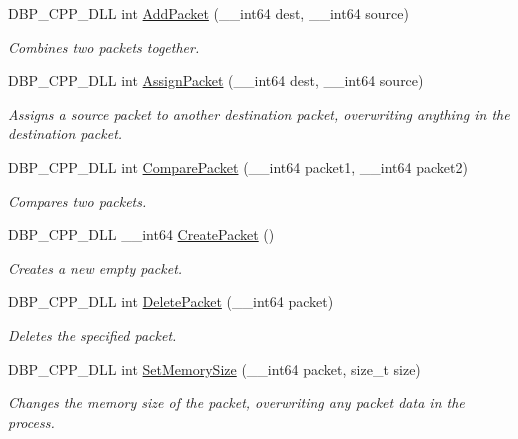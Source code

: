 \begin{DoxyCompactItemize}
DBP\_\-CPP\_\-DLL int \hyperlink{namespacemn_adcd416fad1bd4e97075d610dd89c5501}{AddPacket} (\_\-\_\-int64 dest, \_\-\_\-int64 source)
\begin{DoxyCompactList}\small\item\em Combines two packets together. \item\end{DoxyCompactList}\item 
DBP\_\-CPP\_\-DLL int \hyperlink{namespacemn_a11a1517b94d11908e08bd1a5edfecbce}{AssignPacket} (\_\-\_\-int64 dest, \_\-\_\-int64 source)
\begin{DoxyCompactList}\small\item\em Assigns a source packet to another destination packet, overwriting anything in the destination packet. \item\end{DoxyCompactList}\item 
DBP\_\-CPP\_\-DLL int \hyperlink{namespacemn_a67b272ded28669e8c163b425f8893351}{ComparePacket} (\_\-\_\-int64 packet1, \_\-\_\-int64 packet2)
\begin{DoxyCompactList}\small\item\em Compares two packets. \item\end{DoxyCompactList}\item 
DBP\_\-CPP\_\-DLL \_\-\_\-int64 \hyperlink{namespacemn_a3bd0a3da67665406c73878e2f4ae92b0}{CreatePacket} ()
\begin{DoxyCompactList}\small\item\em Creates a new empty packet. \item\end{DoxyCompactList}\item 
DBP\_\-CPP\_\-DLL int \hyperlink{namespacemn_ad2934b8fb371f044330f7ddb4e7f5c01}{DeletePacket} (\_\-\_\-int64 packet)
\begin{DoxyCompactList}\small\item\em Deletes the specified packet. \item\end{DoxyCompactList}\item 
DBP\_\-CPP\_\-DLL int \hyperlink{namespacemn_a7c01a84cc17bd2b5e7b78a471c1d7b18}{SetMemorySize} (\_\-\_\-int64 packet, size\_\-t size)
\begin{DoxyCompactList}\small\item\em Changes the memory size of the packet, overwriting any packet data in the process. \item\end{DoxyCompactList}\item 

\end{DoxyCompactItemize}
